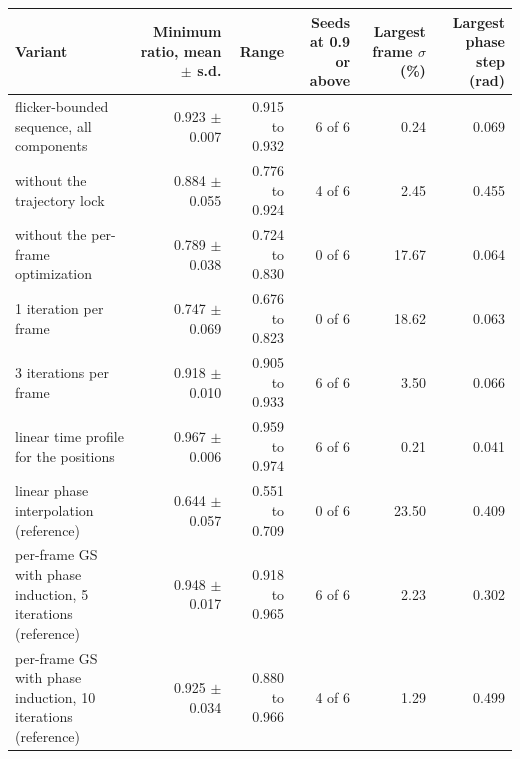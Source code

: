 \begin{tabular}{@{}l r r r r r@{}}
\toprule
Variant & Minimum ratio, mean $\pm$ s.d. & Range & Seeds at 0.9 or above & Largest frame $\sigma$ (\%) & Largest phase step (rad) \\
\midrule
flicker-bounded sequence, all components & 0.923 $\pm$ 0.007 & 0.915 to 0.932 & 6 of 6 & 0.24 & 0.069 \\
without the trajectory lock & 0.884 $\pm$ 0.055 & 0.776 to 0.924 & 4 of 6 & 2.45 & 0.455 \\
without the per-frame optimization & 0.789 $\pm$ 0.038 & 0.724 to 0.830 & 0 of 6 & 17.67 & 0.064 \\
1 iteration per frame & 0.747 $\pm$ 0.069 & 0.676 to 0.823 & 0 of 6 & 18.62 & 0.063 \\
3 iterations per frame & 0.918 $\pm$ 0.010 & 0.905 to 0.933 & 6 of 6 & 3.50 & 0.066 \\
linear time profile for the positions & 0.967 $\pm$ 0.006 & 0.959 to 0.974 & 6 of 6 & 0.21 & 0.041 \\
linear phase interpolation (reference) & 0.644 $\pm$ 0.057 & 0.551 to 0.709 & 0 of 6 & 23.50 & 0.409 \\
per-frame GS with phase induction, 5 iterations (reference) & 0.948 $\pm$ 0.017 & 0.918 to 0.965 & 6 of 6 & 2.23 & 0.302 \\
per-frame GS with phase induction, 10 iterations (reference) & 0.925 $\pm$ 0.034 & 0.880 to 0.966 & 4 of 6 & 1.29 & 0.499 \\
\bottomrule
\end{tabular}
